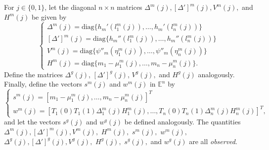 \documentclass[12pt]{article}
\begin{document}
\begin{appendices}
\begin{refsection}
		For $j \in \{0,1\}$, let the diagonal $n \times n$ matrices $\Delta^m(j), [\Delta']^m(j), V^m(j),$ and $H^m(j)$ be given by
		$$\begin{cases}
		\Delta^m(j) = \textrm{diag} \{ h_m'(l_1^m(j)), \dots, h_m'( l_n^m(j) ) \} \\
		[\Delta']^m(j) = \textrm{diag} \{ h_m''(l_1^m(j)), \dots, h_m''( l_n^m(j)) \} \\
		V^m(j) = \textrm{diag} \{\psi''_m( \eta^m_1(j)), \dots, \psi''_m( \eta^m_n(j))\} \\
		H^m(j) = \textrm{diag} \{m_1 - \mu_1^m(j), \dots, m_n - \mu_n^m(j)\} .
		\end{cases}
		$$
		Define the matrices $\Delta^g(j)$, $[\Delta']^{g}(j)$, $V^g(j),$ and $H^g(j)$ analogously. Finally, define the vectors $s^m(j)$ and $w^m(j)$ in $\mathbb{E}^n$ by 
		$$ \begin{cases}
		s^m(j) = [m_1 - \mu_1^m(j), \dots, m_n - \mu_n^m(j) ]^T \\ w^m(j) = [ T_1(0)T_1(1)\Delta^m_1(j) H^m_1(j), \dots, T_n(0)T_n(1)\Delta_n^m(j) H_n^m(j)]^T,
		\end{cases} $$
		and let the vectors $s^g(j)$ and $w^g(j)$ be defined analogously. The quantities $\Delta^m(j), [\Delta']^m(j), V^m(j),$ $H^m(j),$ $s^m(j),$ $w^m(j),$ $\Delta^g(j), [\Delta']^g(j), V^g(j),$ $H^g(j),$ $s^g(j),$ and $w^g(j)$ are all \textit{observed}. 
		

\end{refsection}
\end{appendices}
\end{document}
